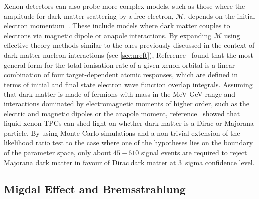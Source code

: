 Xenon detectors can also probe more complex models, such as those where the amplitude for dark matter scattering by a free electron, $\mathcal{M}$, depends on the initial electron momentum~\cite{Catena:2019gfa}. These include models where dark matter couples to electrons via magnetic dipole or anapole interactions. By expanding $\mathcal{M}$ using effective theory methods similar to the ones previously discussed in the context of dark matter-nucleon interactions (see \autoref{sec:nreft}), Reference~\cite{Catena:2019gfa} found that the most general form for the total ionisation rate of a given xenon orbital is a linear combination of four target-dependent atomic responses, which are defined in terms of initial and final state electron wave function overlap integrals. Assuming that dark matter is made of fermions with mass in the MeV-GeV range and interactions dominated by electromagnetic moments of higher order, such as the electric and magnetic dipoles or the anapole moment, reference~\cite{Catena:2020tbv} showed that liquid xenon TPCs can shed light on whether dark matter is a Dirac or Majorana particle. By using Monte Carlo simulations and a non-trivial extension of the likelihood ratio test to the case where one of the hypotheses lies on the boundary of the parameter space, only about $45-610$ signal events are required to reject Majorana dark matter in favour of Dirac dark matter at 3~sigma confidence level. 

\subsection{Migdal Effect and Bremsstrahlung}\label{sec:migdal}

